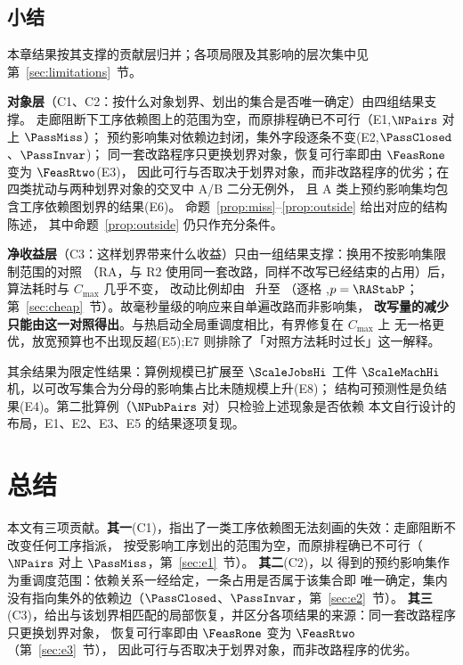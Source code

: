 \subsection{小结}
\label{sec:exp_summary}

本章结果按其支撑的贡献层归并；各项局限及其影响的层次集中见第~\ref{sec:limitations}~节。

\textbf{对象层}（C1、C2：按什么对象划界、划出的集合是否唯一确定）由四组结果支撑。
走廊阻断下工序依赖图上的范围为空，而原排程确已不可行（E1,\(\NPairs\) 对上 \(\PassMiss\)）；
预约影响集对依赖边封闭，集外字段逐条不变(E2,\(\PassClosed\)、\(\PassInvar\))；
同一套改路程序只更换划界对象，恢复可行率即由 \(\FeasRone\) 变为 \(\FeasRtwo\)(E3)，
因此可行与否取决于划界对象，而非改路程序的优劣；在四类扰动与两种划界对象的交叉中 A/B 二分无例外，
且 A 类上预约影响集均包含工序依赖图划界的结果(E6)。
命题~\ref{prop:miss}--\ref{prop:outside} 给出对应的结构陈述，
其中命题~\ref{prop:outside} 仍只作充分条件。

\textbf{净收益层}（C3：这样划界带来什么收益）只由一组结果支撑：换用不按影响集限制范围的对照
（RA，与 R2 使用同一套改路，同样不改写已经结束的占用）后，算法耗时与 \(C_{\max}\) 几乎不变，
改动比例却由 \ResFracCheapRtwo\ 升至 \ResFracAllFuture（逐格 \RAStabWTL,\(p=\RAStabP\)；
第~\ref{sec:cheap}~节）。故毫秒量级的响应来自单遍改路而非影响集，
\textbf{改写量的减少只能由这一对照得出}。与热启动全局重调度相比，有界修复在 \(C_{\max}\) 上
无一格更优，放宽预算也不出现反超(E5);E7 则排除了「对照方法耗时过长」这一解释。

其余结果为限定性结果：算例规模已扩展至 \(\ScaleJobsHi\) 工件
\(\ScaleMachHi\) 机，以可改写集合为分母的影响集占比未随规模上升(E8)；
结构可预测性是负结果(E4)。第二批算例（\(\NPubPairs\) 对）只检验上述现象是否依赖
本文自行设计的布局，E1、E2、E3、E5 的结果逐项复现。

\section{总结}
\label{sec:conclusion}

本文有三项贡献。\textbf{其一}(C1)，指出了一类工序依赖图无法刻画的失效：走廊阻断不改变任何工序指派，
按受影响工序划出的范围为空，而原排程确已不可行（\(\NPairs\) 对上 \(\PassMiss\)，第~\ref{sec:e1}~节）。
\textbf{其二}(C2)，以 \STRC 得到的预约影响集作为重调度范围：依赖关系一经给定，一条占用是否属于该集合即
唯一确定，集内没有指向集外的依赖边（\(\PassClosed\)、\(\PassInvar\)，第~\ref{sec:e2}~节）。
\textbf{其三}(C3)，给出与该划界相匹配的局部恢复，并区分各项结果的来源：同一套改路程序只更换划界对象，
恢复可行率即由 \(\FeasRone\) 变为 \(\FeasRtwo\)（第~\ref{sec:e3}~节），
因此可行与否取决于划界对象，而非改路程序的优劣。

